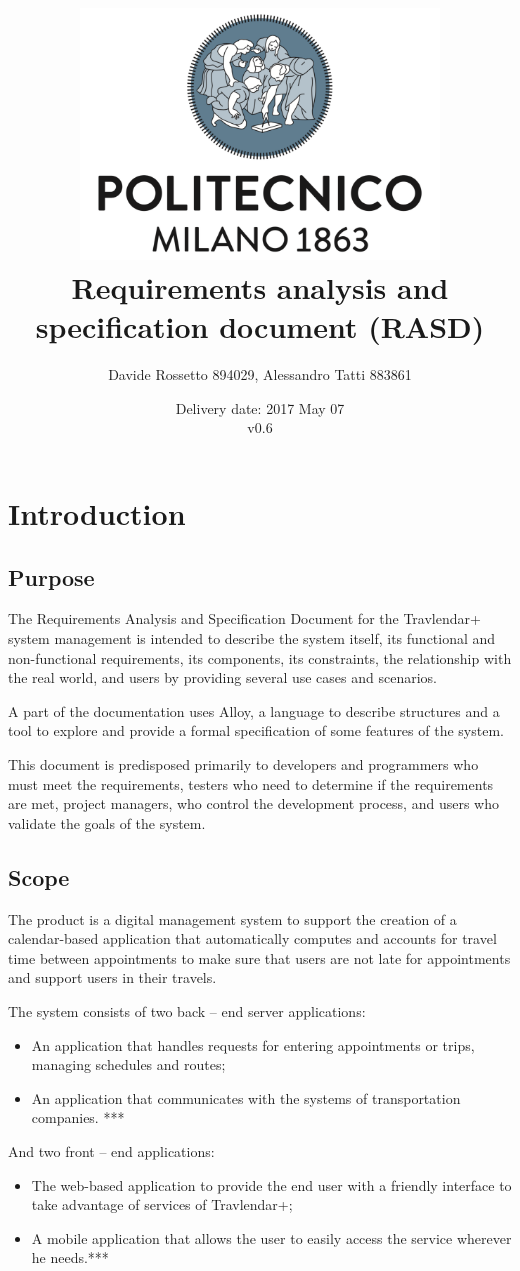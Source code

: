 \documentclass{article}
\title{ 
	\includegraphics[width=95mm]{img/PolimiLogo.png} \\
	\bigskip
	Requirements analysis and specification document (RASD)
}
\author{
	Davide Rossetto 894029, Alessandro Tatti 883861
}
\date{
	Delivery date: 2017 May 07\\
	\bigskip v0.6
}
\begin{document}
	
\maketitle
\newpage
\tableofcontents
\newpage
	
	
	\section{Introduction}
	
	
	\subsection{Purpose}
	The Requirements Analysis and Specification Document for the Travlendar+ system management is intended to describe the system itself, its functional and non-functional requirements, its components, its constraints, the relationship with the real world, and users by providing several use cases and scenarios.
	
	A part of the documentation uses Alloy, a language to describe structures and a tool to explore and provide a formal specification of some features of the system.
	
	\bigskip
	This document is predisposed primarily to developers and programmers who must meet the requirements, testers who need to determine if the requirements are met, project managers, who control the development process, and users who validate the goals of the system.
	
	
	\subsection{Scope}
	The product is a digital management system to support the creation of a calendar-based application that automatically computes and accounts for travel time between appointments to make sure that users are not late for appointments and support users in their travels.

	\bigskip
	The system consists of two back -- end server applications:
	\begin{itemize}
		\item An application that handles requests for entering appointments or trips, managing schedules and routes;
		\item An application that communicates with the systems of transportation companies. ***
	\end{itemize}

	\bigskip
	And two front -- end applications:
	\begin{itemize}
		\item The web-based application to provide the end user with a friendly interface to take advantage of services of Travlendar+;
		\item A mobile application that allows the user to easily access the service wherever he needs.***
	\end{itemize}
\end{document}
